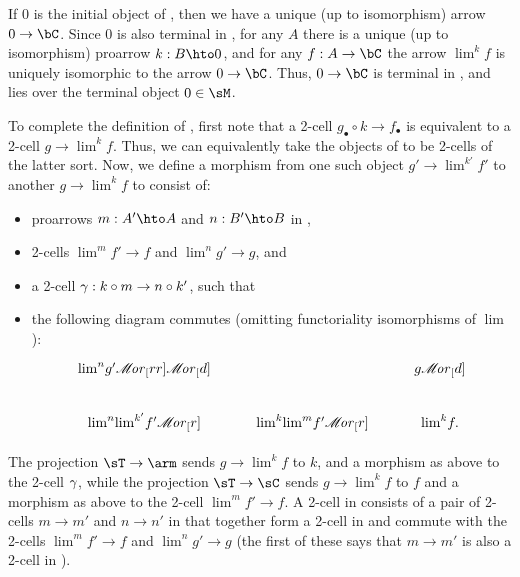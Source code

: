 \documentclass{amsart}
\def\ar#1{\mathscr{M}\!\mathit{or}_{#1}}
\def\rep#1{{#1}_\bullet}
\let\mylim\lim
\def\lim{{\textstyle\mylim}}
\begin{document}
\begin{constr}
  If $0$ is the initial object of \sK, then we have a unique (up to isomorphism) arrow $0\to \bC$.
  Since $0$ is also terminal in \sM, for any $A$ there is a unique (up to isomorphism) proarrow $k:B\hto 0$, and for any $f:A\to \bC$ the arrow $\lim^k f$ is uniquely isomorphic to the arrow $0\to\bC$.
  Thus, $0\to \bC$ is terminal in \sC, and lies over the terminal object $0\in\sM$.

  To complete the definition of \sT, first note that a 2-cell $\rep g \circ k \to \rep f$ is equivalent to a 2-cell $g\to\lim^k f$.
  Thus, we can equivalently take the objects of \sT to be 2-cells of the latter sort.
  Now, we define a morphism from one such object $g'\to\lim^{k'} f'$ to another $g\to\lim^k f$ to consist of:
  \begin{itemize}
  \item proarrows $m:A'\hto A$ and $n:B'\hto B$ in \sM,
  \item 2-cells $\lim^m f' \to f$ and $\lim^n g' \to g$, and
  \item a 2-cell $\gamma : k\circ m  \to n\circ k'$, such that
  \item the following diagram commutes (omitting functoriality isomorphisms of $\lim$):
    \begin{equation}
      \begin{tikzcd}
        \lim^n g' \ar[rr] \ar[d] && g \ar[d] \\
        \lim^n \lim^{k'} f' \ar[r] & \lim^k \lim^m  f' \ar[r] & \lim^k f.
      \end{tikzcd}\label{eq:Tax}
    \end{equation}
  \end{itemize}
  The projection $\sT\to\arm$ sends $g\to\lim^k f$ to $k$, and a morphism as above to the 2-cell $\gamma$, while the projection $\sT\to\sC$ sends $g\to\lim^k f$ to $f$ and a morphism as above to the 2-cell $\lim^m f' \to f$.
  A 2-cell in \sT consists of a pair of 2-cells $m\to m'$ and $n \to n'$ in \sM that together form a 2-cell in \arm and commute with the 2-cells $\lim^m f' \to f$ and $\lim^n g' \to g$ (the first of these says that $m\to m'$ is also a 2-cell in \sC).


\end{constr}
\end{document}
